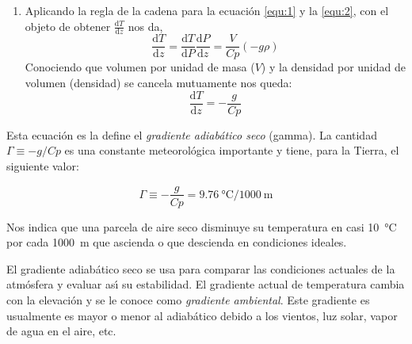 \begin{enumerate}
\begin{equation}
P(z) = P(z+\mathrm{d}z) +\frac{g \rho A\,\mathrm{d}z}{A}
\end{equation}
\'o
\begin{equation}
dP =P(z+\mathrm{d}z) - P(z) = -g\rho\, \mathrm{d}z
\end{equation}
simplificando y factorizando tenemos la ecuaci\'on hidrost\'atica que se representa:
\begin{equation}
\frac{dP}{\mathrm{d}z}= -g\rho
\label{equ:2}
\end{equation}
\item Aplicando la regla de la cadena para  la ecuaci\'on \ref{equ:1}  y la   \ref{equ:2}, 
con el objeto de obtener $\frac{\mathrm{d}T}{\mathrm{d}z}$ nos da,
\begin{equation}
\frac{\mathrm{d}T}{\mathrm{d}z}=\frac{\mathrm{d}T}{\mathrm{d}P}\frac{\mathrm{d}P}{\mathrm{d}z} =\frac{V}{Cp}(-g\rho)
\end{equation}
Conociendo que volumen por unidad de masa ($V$) y la densidad por unidad de volumen (\gls{densidad}) se cancela mutuamente nos queda:
\begin{equation}
\frac{\mathrm{d}T}{\mathrm{d}z}=-\frac{g}{Cp}
\label{equ:3}
\end{equation}
\end{enumerate}

Esta ecuaci\'on es la define el \textit{gradiente adiab\'atico seco} (\gls{gamma}). La cantidad $\Gamma\equiv-g/Cp$  es una constante meteorol\'ogica importante y tiene, para la Tierra, el siguiente valor:

$$\Gamma \equiv-\frac{g}{Cp}=\SI{9.76}{\celsius}/\SI{1000}{\metre}$$

Nos indica que una parcela de aire seco disminuye su temperatura en casi \SI{10}{\celsius} por cada \SI{1000}{\metre} que ascienda o que descienda en condiciones ideales.

El gradiente adiab\'atico seco se usa para comparar las condiciones actuales de la atm\'osfera y evaluar as\'{\i} su estabilidad. El gradiente actual de temperatura cambia con la elevaci\'on y se le conoce como  \textit{gradiente ambiental}. Este gradiente es usualmente es mayor o menor al adiab\'atico debido a los vientos, luz solar, vapor de agua en el aire, etc.

